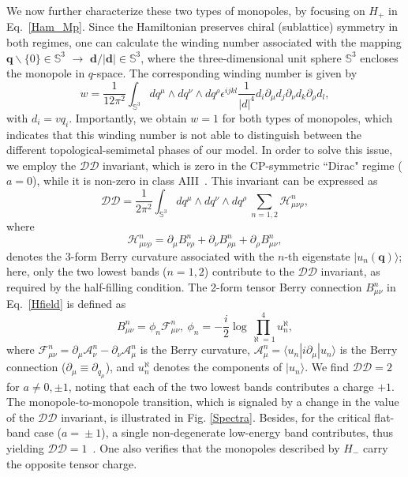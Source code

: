 \documentclass[twocolumn,prl,10pt,superscriptaddress]{revtex4}
\begin{document}
We now further characterize these two types of monopoles, by focusing on $H_{+}$ in Eq.~\eqref{Ham_Mp}.
Since the Hamiltonian preserves chiral (sublattice) symmetry in both regimes, one can calculate
 the winding number associated with the mapping ${\boldsymbol q}\backslash\{0\}\in \mathbb{S}^3$ $\rightarrow$ $\mathbf{d}/|\mathbf{d}|\in \mathbb{S}^3$, where the three-dimensional unit sphere $\mathbb{S}^3$ encloses the monopole in $q$-space. The corresponding winding number is given by \cite{Schnyder2008,DWZhang2018,Neupert2012}
\begin{equation}\label{WindEq}
w=\frac{1}{12\pi^2}\int_{\mathbb{S}^3}dq^{\mu}\wedge dq^{\nu}\wedge{dq^{\rho}}\epsilon^{ijkl}\frac{1}{|d|^4}d_i\partial_{\mu}d_j\partial_{\nu}d_k\partial_{\rho}d_l,
\end{equation}
with $d_i=v q_i$. Importantly, we obtain $w=1$ for both types of monopoles, which indicates that this winding number is not able to distinguish between the different topological-semimetal phases of our model. In order to solve this issue,
we employ the $\mathcal{DD}$ invariant, which is zero in the CP-symmetric ``Dirac" regime ($a\!=\!0$), while it is non-zero in class AIII~\cite{Palumbo2018,Palumbo2019}. This invariant can be expressed as
\begin{equation}\label{DDEq}
\mathcal{DD}=\frac{1}{2\pi^2}\int_{\mathbb{S}^3}dq^{\mu}\wedge dq^{\nu}\wedge{dq^{\rho}}~
 \sum_{n=1,2}\mathcal{H}^n_{\mu\nu\rho},
\end{equation}
where
\begin{equation}
 \mathcal{H}^{n}_{\mu\nu\rho}=\partial_{\mu}B^n_{\nu\rho}+\partial_{\nu}B^n_{\rho\mu}+\partial_{\rho}B^n_{\mu\nu} ,\label{Hfield}
 \end{equation}
 denotes the 3-form Berry curvature associated with the $n$-th eigenstate $|u_{n}({\boldsymbol q})\rangle$; here, only the two lowest bands ($n\!=\!1,2$) contribute to the $\mathcal{DD}$ invariant, as required by the half-filling condition. The 2-form tensor Berry connection $B^n_{\mu\nu}$ in Eq.~\eqref{Hfield} is defined as~\cite{Palumbo2019}
\begin{equation}
B^n_{\mu\nu}=\phi_n \mathcal{F}^n_{\mu\nu},~\phi_n=-\frac{i}{2} \log \prod^4_{\aleph=1} u^{\aleph}_{n},
\end{equation}
where  $\mathcal{F}^{n}_{\mu\nu}=\partial_{\mu}\mathcal{A}^n_{\nu}-\partial_{\nu}\mathcal{A}^n_{\mu}$ is the Berry curvature, $\mathcal{A}^n_{\mu}=\langle u_{n}|i\partial_{\mu}|u_{n}\rangle$ is the Berry connection ($\partial_{\mu}\equiv \partial_{q_\mu}$), and $u^{\aleph}_{n}$ denotes the components of $|u_{n}\rangle$.
We find $\mathcal{DD}\!=\!2$ for $a\neq 0,\pm 1$, noting that each of the two lowest bands contributes a charge $+1$. The monopole-to-monopole transition, which is signaled by a change in the value of the $\mathcal{DD}$ invariant, is illustrated in Fig. \ref{Spectra}. Besides, for the critical flat-band case ($a\!=\!\pm1$), a single non-degenerate low-energy band contributes, thus yielding $\mathcal{DD}\!=\!1$~\cite{Palumbo2018}. One also verifies that the monopoles described by $H_-$ carry the opposite tensor charge.
\end{document}
